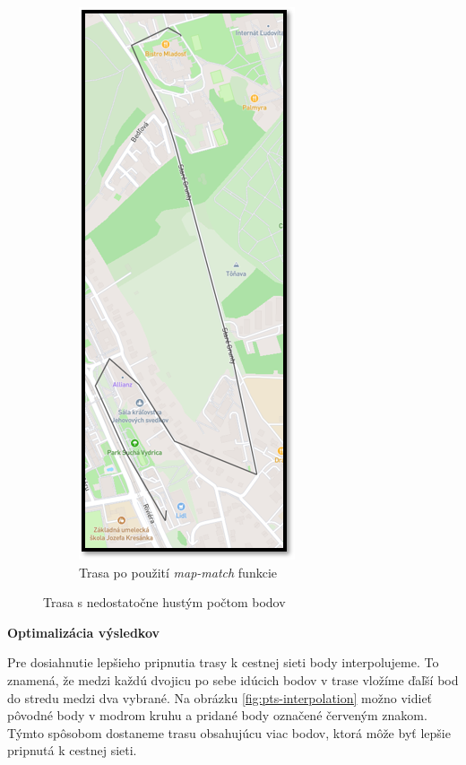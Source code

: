 \begin{figure}[H]
\begin{subfigure}{0.45\textwidth}
        \includegraphics[width=.5\textwidth]{img/map-match rozdiel/malo bodov po.png}
        \caption{Trasa po použití \textit{map-match} funkcie}
        \label{fig:map-match-low-points-after}
    \end{subfigure}
    \caption{Trasa s nedostatočne hustým počtom bodov}
    \label{fig:map-match-low-points}
\end{figure}

\noindent\textbf{Optimalizácia výsledkov}

Pre dosiahnutie lepšieho pripnutia trasy k cestnej sieti body interpolujeme. To znamená, že medzi každú dvojicu po sebe idúcich bodov v trase vložíme ďaľší bod do stredu medzi dva vybrané. Na obrázku \ref{fig:pts-interpolation} možno vidieť pôvodné body v modrom kruhu a pridané body označené červeným znakom. Týmto spôsobom dostaneme trasu obsahujúcu viac bodov, ktorá môže byť lepšie pripnutá k cestnej sieti.  

